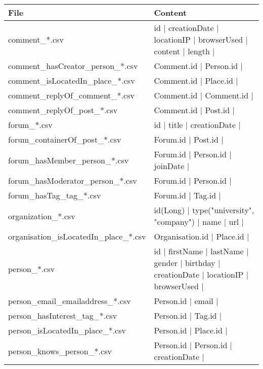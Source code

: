 \begin{landscape}
    \begin{table}[t]
        \footnotesize
        \centering
        \begin{tabular}{|p{5cm}|p{19cm}|}
            \hline
            \textbf{File} & \textbf{Content} \\
            \hline
            comment\_*.csv & id | creationDate | locationIP | browserUsed | content | length |\\
            \hline
            comment\_hasCreator\_person\_*.csv & Comment.id | Person.id |\\
            \hline
            comment\_isLocatedIn\_place\_*.csv & Comment.id | Place.id |\\
            \hline
            comment\_replyOf\_comment\_*.csv & Comment.id | Comment.id |\\
            \hline
            comment\_replyOf\_post\_*.csv &  Comment.id | Post.id |\\ 
            \hline
            forum\_*.csv & id | title | creationDate |\\
            \hline
            forum\_containerOf\_post\_*.csv & Forum.id | Post.id |\\    
            \hline
            forum\_hasMember\_person\_*.csv & Forum.id | Person.id | joinDate |\\
            \hline
            forum\_hasModerator\_person\_*.csv & Forum.id | Person.id |\\
            \hline
            forum\_hasTag\_tag\_*.csv & Forum.id | Tag.id |\\
            \hline
            organization\_*.csv & id(Long) | type({"university", "company"}) | name | url |\\
            \hline
            organisation\_isLocatedIn\_place\_*.csv & Organisation.id | Place.id |\\
            \hline
            person\_*.csv & id | firstName | lastName | gender | birthday | creationDate | locationIP | browserUsed |\\ 
            \hline
            person\_email\_emailaddress\_*.csv & Person.id | email |\\
            \hline
            person\_hasInterest\_tag\_*.csv &  Person.id | Tag.id |\\
            \hline
            person\_isLocatedIn\_place\_*.csv & Person.id | Place.id |\\
            \hline
            person\_knows\_person\_*.csv & Person.id | Person.id | creationDate |\\

\end{tabular}
\end{table}
\end{landscape}
